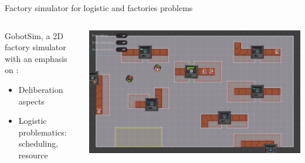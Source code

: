 \begin{frame}{Factory simulator for logistic and factories problems}
    \begin{columns}
        \begin{column}{0.5\textwidth}
            GobotSim, a 2D factory simulator with an emphasis on :
            \begin{itemize}
                \item Deliberation aspects
                \item Logistic problematics: scheduling, resource
            \end{itemize}
        \end{column}
        \begin{column}{0.5\textwidth}
            \includegraphics[width=\linewidth]{images/gobot-rae.png}
        \end{column}
    \end{columns}
    ~~


\end{frame}
